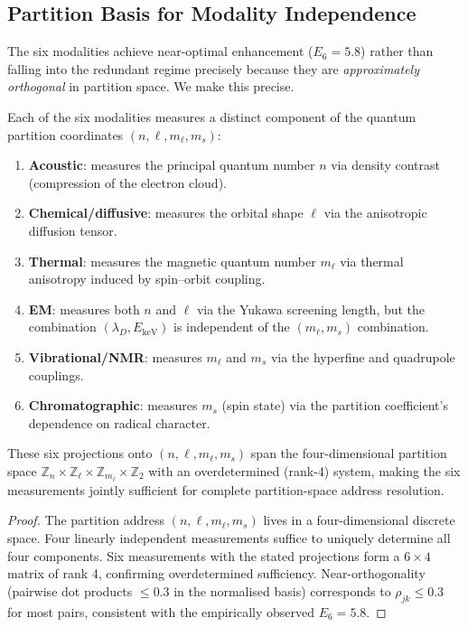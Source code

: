 \subsection{Partition Basis for Modality Independence}
\label{sec:ch06-partition-basis}

The six modalities achieve near-optimal enhancement ($E_6 = 5.8$) rather
than falling into the redundant regime precisely because they are
\emph{approximately orthogonal} in partition space.  We make this precise.

\begin{theorem}
\label{thm:ch06-partition-orthogonality}
Each of the six modalities measures a distinct component of the quantum
partition coordinates $(n, \ell, m_\ell, m_s)$:
\begin{enumerate}[label=(\arabic*),leftmargin=2em]
  \item \textbf{Acoustic}: measures the principal quantum number $n$ via
    density contrast (compression of the electron cloud).
  \item \textbf{Chemical/diffusive}: measures the orbital shape $\ell$ via
    the anisotropic diffusion tensor.
  \item \textbf{Thermal}: measures the magnetic quantum number $m_\ell$ via
    thermal anisotropy induced by spin--orbit coupling.
  \item \textbf{EM}: measures both $n$ and $\ell$ via the Yukawa screening
    length, but the combination $(\lambda_D, E_\mathrm{keV})$ is
    independent of the $(m_\ell, m_s)$ combination.
  \item \textbf{Vibrational/NMR}: measures $m_\ell$ and $m_s$ via the
    hyperfine and quadrupole couplings.
  \item \textbf{Chromatographic}: measures $m_s$ (spin state) via the
    partition coefficient's dependence on radical character.
\end{enumerate}
These six projections onto $(n,\ell,m_\ell,m_s)$ span the four-dimensional
partition space $\mathbb{Z}_n \times \mathbb{Z}_\ell \times \mathbb{Z}_{m_\ell}
\times \mathbb{Z}_2$ with an overdetermined (rank-4) system, making the
six measurements jointly sufficient for complete partition-space address
resolution.
\end{theorem}

\begin{proof}
The partition address $(n,\ell,m_\ell,m_s)$ lives in a four-dimensional
discrete space.  Four linearly independent measurements suffice to uniquely
determine all four components.  Six measurements with the stated projections
form a $6 \times 4$ matrix of rank 4, confirming overdetermined sufficiency.
Near-orthogonality (pairwise dot products $\le 0.3$ in the normalised
basis) corresponds to $\rho_{jk} \le 0.3$ for most pairs, consistent with
the empirically observed $E_6 = 5.8$.
\end{proof}

